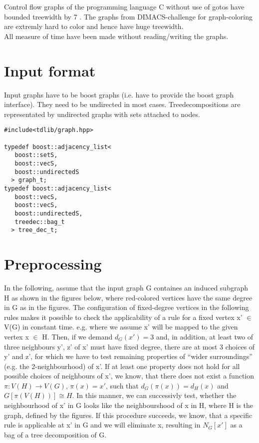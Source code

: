 \documentclass[a4wide]{article}
\begin{document}
Control flow graphs of the programming language C without use of gotos have bounded treewidth by 7 \cite{thorup, C-tree}.
The graphs from DIMACS-challenge for graph-coloring are extremly hard to color and hence have huge treewidth. \\ 

All measure of time have been made without reading/writing the graphs. \\

\section{Input format}

Input graphs have to be boost graphs (i.e. have to provide the boost graph interface). They need to be undirected in most cases. Treedecompositions are representated by undirected graphs with sets attached to nodes.

\begin{lstlisting}[mathescape]
#include<tdlib/graph.hpp>

typedef boost::adjacency_list<
   boost::setS,
   boost::vecS,
   boost::undirectedS
  > graph_t;
typedef boost::adjacency_list<
   boost::vecS,
   boost::vecS,
   boost::undirectedS,
   treedec::bag_t
  > tree_dec_t;
\end{lstlisting}

\newpage

\section{Preprocessing}

In the following, assume that the input graph G containes an induced subgraph H as shown in the figures below, where red-colored vertices have the same degree in G as in the figures. The configuration of fixed-degree vertices in the following rules makes it possible to check the applicability of a rule for a fixed vertex x' $\in$ V(G) in constant time. e.g. where we assume x' will be mapped to the given vertex x $\in$ H. Then, if we demand $d_{G}(x') = 3$ and, in addition, at least two of three neighbours y', z' of x' must have fixed degree, there are at most 3 choices of y' and z', for which we have to test remaining properties of \enquote{wider surroundings} (e.g. the 2-neighbourhood) of x'. If at least one property does not hold for all possible choices of neighbours of x', we know, that there does not exist a function $\pi: V(H) \rightarrow V(G)$, $\pi(x) = x'$, such that $d_{G}(\pi(x)) = d_{H}(x)$ and $G[\pi(V(H))] \cong H$. In this manner, we can successivly test, whether the neighbourhood of x' in G looks like the neighbourshood of x in H, where H is the graph, defined by the figures. If this procedure succeeds, we know, that a specific rule is applicable at x' in G and we will eliminate x, resulting in $N_{G}[x']$ as a bag of a tree decomposition of G.
\end{document}

